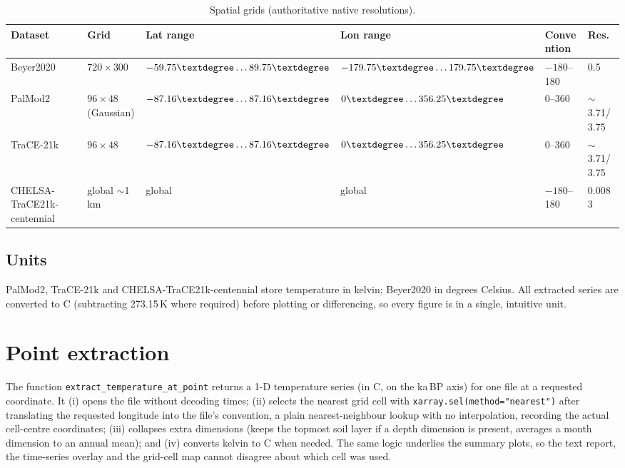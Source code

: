 \documentclass{isprs} %
\newcommand{\dg}{\textdegree}
\newcommand{\degC}{\textdegree C}
\newcommand{\tabbr}[1]{\texttt{#1}}
\newcommand{\kaBP}{ka\,BP}
\begin{document}
\begin{table}[t]
\centering
\small
\begin{tabular}{llllll}
\toprule
Dataset   & Grid                    & Lat range                   & Lon range                     & Convention  & Res. \\
\midrule
Beyer2020 & $720\times300$          & $-59.75\dg \ldots 89.75\dg$ & $-179.75\dg \ldots 179.75\dg$ & $-180$--180 & 0.5\dg \\
PalMod2   & $96\times48$ (Gaussian) & $-87.16\dg \ldots 87.16\dg$ & $0\dg \ldots 356.25\dg$       & 0--360      & $\sim$3.71/3.75\dg \\
TraCE-21k & $96\times48$            & $-87.16\dg \ldots 87.16\dg$ & $0\dg \ldots 356.25\dg$       & 0--360      & $\sim$3.71/3.75\dg \\
CHELSA-TraCE21k-centennial    & global $\sim$1\,km      & global                      & global                        & $-180$--180 & 0.0083\dg \\
\bottomrule
\end{tabular}
\caption{Spatial grids (authoritative native resolutions).}
\label{tab:space}
\end{table}

\subsection{Units}
PalMod2, TraCE-21k and CHELSA-TraCE21k-centennial store temperature in kelvin; Beyer2020 in degrees Celsius. All extracted series are converted to \degC{} (subtracting 273.15\,K where required) before plotting or differencing, so every figure is in a single, intuitive unit.

\section{Point extraction}
The function \tabbr{extract\_temperature\_at\_point} returns a 1-D temperature series (in \degC, on the \kaBP{} axis) for one file at a requested coordinate. It (i) opens the file without decoding times; (ii) selects the nearest grid cell with \tabbr{xarray.sel(method="nearest")} after translating the requested longitude into the file's convention, a plain nearest-neighbour lookup with no interpolation, recording the actual cell-centre coordinates; (iii) collapses extra dimensions (keeps the topmost soil layer if a depth dimension is present, averages a month dimension to an annual mean); and (iv) converts kelvin to \degC{} when needed. The same logic underlies the summary plots, so the text report, the time-series overlay and the grid-cell map cannot disagree about which cell was used.
\end{document}
